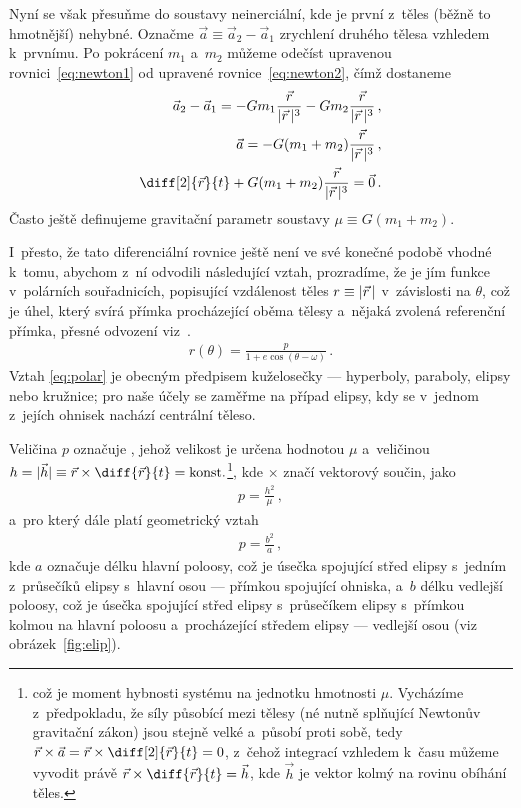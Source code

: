 \documentclass[A4paper, 12pt, oneside]{book}
\begin{document}
Nyní se však přesuňme do soustavy neinerciální, kde je první z~těles (běžně to hmotnější) nehybné. Označme $\vec{a}\equiv\vec{a}_2-\vec{a}_1$ zrychlení druhého tělesa vzhledem k~prvnímu. Po pokrácení $m_1$ a~$m_2$ můžeme odečíst upravenou rovnici~\eqref{eq:newton1} od upravené rovnice~\eqref{eq:newton2}, čímž dostaneme
\begin{align}
	\nonumber \vec{a}_2 - \vec{a}_1 = -Gm_1\frac{\vec{r}}{\abs{\vec{r}}^3}-Gm_2\frac{\vec{r}}{\abs{\vec{r}}^3}\,, \\
	\nonumber \vec{a} = -G(m_1+m_2)\frac{\vec{r}}{\abs{\vec{r}}^3}\,, \\
		\diff[2]{\vec{r}}{t} + G(m_1+m_2)\frac{\vec{r}}{\abs{\vec{r}}^3} = \vec{0}\,. \label{eq:eqmotion}
\end{align}
Často ještě definujeme gravitační parametr soustavy $\mu\equiv G(m_1+m_2)$.

I~přesto, že tato diferenciální rovnice ještě není ve své konečné podobě vhodné k~tomu, abychom z~ní odvodili následující vztah, prozradíme, že je jím funkce v~polárních souřadnicích, popisující vzdálenost těles $r\equiv\lvert \vec{r} \,\rvert$ v~závislosti na  $\theta$, což je úhel, který svírá přímka procházející oběma tělesy a~nějaká zvolená referenční přímka, přesné odvození viz~\cite{murray00}.
\begin{align} \label{eq:polar}
	r(\theta)=\frac{p}{1+e\cos{(\theta-\omega)}}\,.
\end{align}
Vztah \eqref{eq:polar} je obecným předpisem kuželosečky --- hyperboly, paraboly, elipsy nebo kružnice; pro naše účely se zaměřme na případ elipsy, kdy se v~jednom z~jejích ohnisek nachází centrální těleso.

Veličina $p$ označuje , jehož velikost je určena hodnotou $\mu$ a~veličinou~$h=|\vec{h}| \equiv \vec{r}\times\diff{\vec{r}}{t}={\rm konst.}$\footnote{což je  moment hybnosti systému na jednotku hmotnosti $\mu$. Vycházíme z~předpokladu, že síly působící mezi tělesy (né nutně splňující Newtonův gravitační zákon) jsou stejně velké a~působí proti sobě, tedy $\vec{r}\times\vec{a}=\vec{r}\times\diff[2]{\vec{r}}{t}=0$, z~čehož integrací vzhledem k~času můžeme vyvodit právě $\vec{r}\times\diff{\vec{r}}{t}=\vec{h}$, kde $\vec{h}$ je vektor kolmý na rovinu obíhání těles.}, kde $\times$ značí vektorový součin, jako
\begin{align}
	p=\frac{h^2}{\mu}\,,
\end{align}
a~pro který dále platí geometrický vztah
\begin{align}
	p=\frac{b^2}{a}\,,
\end{align}
kde $a$ označuje délku hlavní poloosy, což je úsečka spojující střed elipsy s~jedním z~průsečíků elipsy s~hlavní osou --- přímkou spojující ohniska, a~$b$ délku vedlejší poloosy, což je úsečka spojující střed elipsy s~průsečíkem elipsy s~přímkou kolmou na hlavní poloosu a~procházející středem elipsy --- vedlejší osou (viz obrázek~\ref{fig:elip}).
\end{document}
